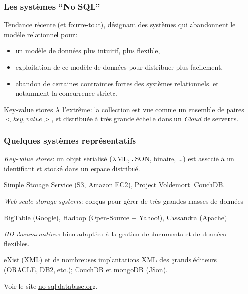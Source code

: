 \begin{frame}
\frametitle{Les systèmes ``No SQL''}

Tendance récente (et fourre-tout), désignant des systèmes qui abandonnent le modèle relationnel
pour\,:

\begin{itemize}
  \item un modèle de données plus intuitif, plus flexible,
  \item exploitation de ce modèle de données pour distribuer plus facilement,
  \item abandon de certaines contraintes fortes des systèmes relationnels, et
  notamment la concurrence stricte.
\end{itemize}

\vfill

\begin{beamerboxesrounded}{Key-value stores}
A l'extrême: la collection est vue comme un ensemble de paires $<key, value>$,
et distribuée à très grande échelle dans un \textit{Cloud} de serveurs.
\end{beamerboxesrounded}

\end{frame}


\begin{frame}
\frametitle{Quelques systèmes représentatifs}


\vfill

\textit{Key-value stores}: un objet sérialisé (XML, JSON, binaire, \ldots) 
   est associé à un identifiant et stocké dans un espace distribué.
   
   \smallskip
   Simple Storage Service (S3, Amazon EC2), Project Voldemort, CouchDB.
   
   \vfill
   
  \textit{Web-scale storage systems}: conçus pour gérer de très grandes masses
  de données 
  
  \smallskip
  BigTable (Google), Hadoop (Open-Source + Yahoo!), Cassandra (Apache)

\vfill
 \textit{BD documenatires}: bien adaptées à la gestion de documents et de
 données flexibles.
 
 
 \smallskip
  eXist (XML) et de nombreuses implantations XML
des grands éditeurs (ORACLE, DB2, etc.); CouchDB et mongoDB (JSon).

\vfill

Voir le site \url{no-sql.database.org}.
\end{frame}



